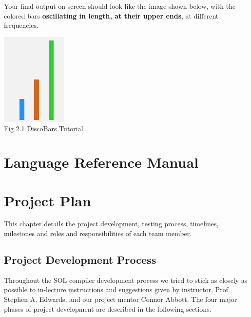 \documentclass[letterpaper,12pt]{report}
\begin{document}
  Your final output on screen should look like the image shown below, with the colored bars \textbf{oscillating in length, at their upper ends}, at different frequencies.\\
  \begin{center}
      \includegraphics[scale=1]{dancing-bars.png}\\
      \caption{Fig 2.1 DiscoBars Tutorial}
  \end{center}


\chapter{Language Reference Manual} \label{lrm}

  

\chapter{Project Plan}

  This chapter details the project development, testing process, timelines, milestones and roles and responsibilities of each team member.

  \section{Project Development Process}
  Throughout the SOL compiler development process we tried to stick as closely as possible to in-lecture instructions and suggestions given by instructor, Prof. Stephen A. Edwards, and our project mentor Connor Abbott. The four major phases of project development are described in the following sections.
\end{document}
